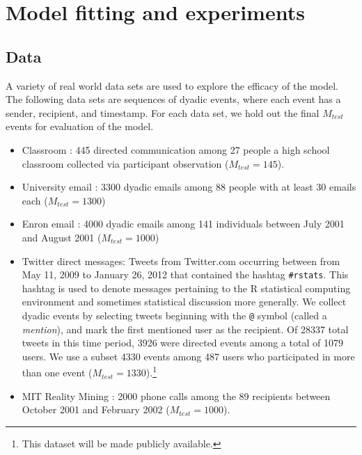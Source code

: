 \section{Model fitting and experiments}
\label{sec:experiments}

\subsection{Data}

A variety of real world data sets are used to explore the efficacy of the model.  The following data sets are sequences of dyadic events, where each event has a sender, recipient, and timestamp.  For each data set, we hold out the final $M_{test}$ events for evaluation of the model.

\begin{itemize}
\item Classroom \cite{McFarland2001}: 445 directed communication among 27 people a high
  school classroom collected via participant observation ($M_{test}= 145$).
\item University email \cite{Eckmann2004}: 3300 dyadic emails among 88 people with at least 30
  emails each ($M_{test} = 1300$)
\item Enron email \cite{Klimt2004}: 4000 dyadic emails among 141
  individuals between July 2001 and August 2001 ($M_{test} = 1000$)
\item Twitter direct messages: Tweets from Twitter.com occurring between from May 11, 2009 to January 26, 2012 that contained the hashtag \texttt{\#rstats}.  This hashtag is used to denote messages pertaining to the R statistical computing environment and sometimes statistical discussion more generally.  We collect dyadic events by selecting tweets beginning with the \texttt{@} symbol (called a \emph{mention}), and mark the first mentioned user as the recipient.
Of 28337 total tweets in this time period, 3926 were directed events among a total of 1079 users.
We use a subset 4330 events among 487 users who participated in more than one event ($M_{test} = 1330$).\footnote{This dataset will be made publicly available.}
\item MIT Reality Mining \cite{Eagle2009}: 2000 phone calls among the
  89 recipients between October 2001 and February 2002 ($M_{test}= 1000$).
\end{itemize}

